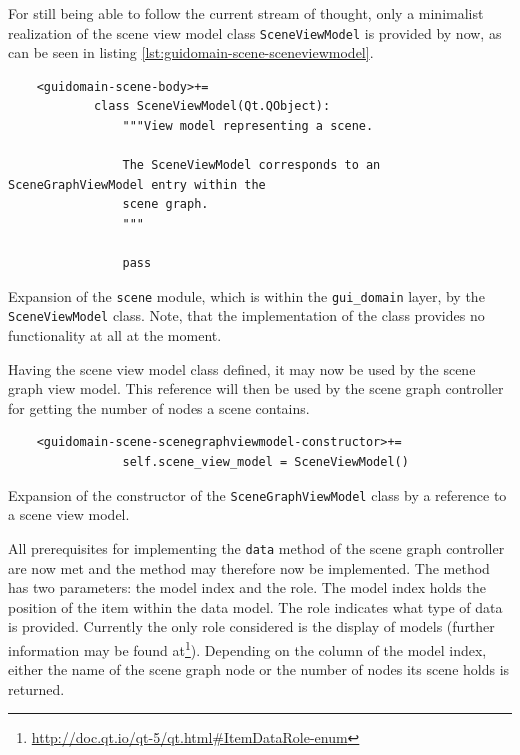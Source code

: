 \documentclass[10pt, openright, notitlepage]{scrreprt}
\begin{document}
For still being able to follow the current stream of thought, only a minimalist
realization of the scene view model class \texttt{SceneViewModel} is provided
by now, as can be seen in listing \ref{lst:guidomain-scene-sceneviewmodel}.

\begin{listing}[H]
\begin{verbatim}
    <guidomain-scene-body>+=
            class SceneViewModel(Qt.QObject):
                """View model representing a scene.
            
                The SceneViewModel corresponds to an SceneGraphViewModel entry within the
                scene graph.
                """
            
                pass
\end{verbatim}
\caption{\label{lst:guidomain-scene-sceneviewmodel}
Expansion of the \texttt{scene} module, which is within the \texttt{gui\_domain} layer, by the \texttt{SceneViewModel} class. Note, that the implementation of the class provides no functionality at all at the moment.}
\end{listing}

Having the scene view model class defined, it may now be used by the scene graph
view model. This reference will then be used by the scene graph controller for
getting the number of nodes a scene contains.

\begin{listing}[H]
\begin{verbatim}
    <guidomain-scene-scenegraphviewmodel-constructor>+=
                self.scene_view_model = SceneViewModel()
\end{verbatim}
\caption{\label{lst:guidomain-scene-scenegraphviewmodel-constructor-01}
Expansion of the constructor of the \texttt{SceneGraphViewModel} class by a reference to a scene view model.}
\end{listing}

All prerequisites for implementing the \texttt{data} method of the scene
graph controller are now met and the method may therefore now be implemented.
The method has two parameters: the model index and the role. The model index
holds the position of the item within the data model. The role indicates what
type of data is provided. Currently the only role considered is the display of
models (further information may be found
at\footnote{\url{http://doc.qt.io/qt-5/qt.html\#ItemDataRole-enum}}).
Depending on the column of the model index, either the name of the scene graph
node or the number of nodes its scene holds is returned.
\end{document}
